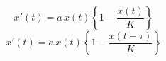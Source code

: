 $$
x'(t)=a \, x(t)\left\{1-\frac{x(t)}{K}\right\}
$$
$$
x'(t)=a \, x(t)\left\{1-\frac{x(t-\tau)}{K}\right\}
$$
